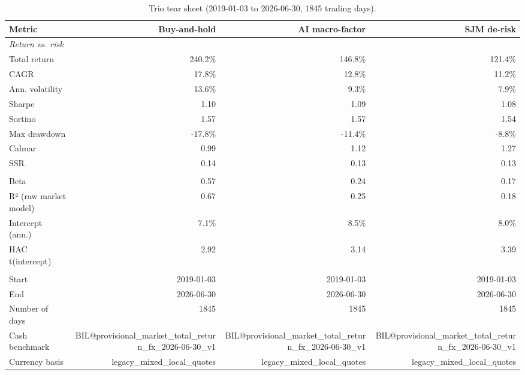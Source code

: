 \begin{table}[htbp]
  \centering
  \caption{Trio tear sheet (2019-01-03 to 2026-06-30, 1845 trading days).}
  \label{tab:tearsheet-thesis}
  \begin{tabular}{lrrr}
    \toprule
    Metric & Buy-and-hold & AI macro-factor & SJM de-risk \\
    \midrule
    \multicolumn{4}{l}{\textit{Return vs. risk}} \\
    Total return & 240.2\% & 146.8\% & 121.4\% \\
    CAGR & 17.8\% & 12.8\% & 11.2\% \\
    Ann. volatility & 13.6\% & 9.3\% & 7.9\% \\
    Sharpe & 1.10 & 1.09 & 1.08 \\
    Sortino & 1.57 & 1.57 & 1.54 \\
    Max drawdown & -17.8\% & -11.4\% & -8.8\% \\
    Calmar & 0.99 & 1.12 & 1.27 \\
    SSR & 0.14 & 0.13 & 0.13 \\
    \addlinespace
    \multicolumn{4}{l}{\textit{Raw market model}} \\
    Beta & 0.57 & 0.24 & 0.17 \\
    R² (raw market model) & 0.67 & 0.25 & 0.18 \\
    Intercept (ann.) & 7.1\% & 8.5\% & 8.0\% \\
    HAC t(intercept) & 2.92 & 3.14 & 3.39 \\
    \addlinespace
    \multicolumn{4}{l}{\textit{Window and provenance}} \\
    Start & 2019-01-03 & 2019-01-03 & 2019-01-03 \\
    End & 2026-06-30 & 2026-06-30 & 2026-06-30 \\
    Number of days & 1845 & 1845 & 1845 \\
    Cash benchmark & BIL@provisional\_market\_total\_return\_fx\_2026-06-30\_v1 & BIL@provisional\_market\_total\_return\_fx\_2026-06-30\_v1 & BIL@provisional\_market\_total\_return\_fx\_2026-06-30\_v1 \\
    Currency basis & legacy\_mixed\_local\_quotes & legacy\_mixed\_local\_quotes & legacy\_mixed\_local\_quotes \\
    \bottomrule
  \end{tabular}
\end{table}

